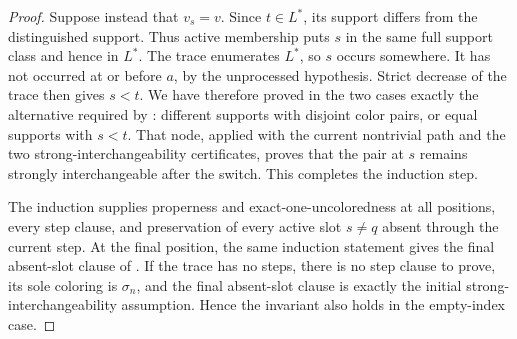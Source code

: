 \begin{proof}
Suppose instead that \(v_s=v\). Since \(t\in L^*\), its support differs from
the distinguished support. Thus active membership puts \(s\) in the same full
support class and hence in \(L^*\). The trace enumerates \(L^*\), so \(s\)
occurs somewhere. It has not occurred at or before \(a\), by the unprocessed
hypothesis. Strict decrease of the trace then gives \(s<t\). We have
therefore proved in the two cases exactly the alternative required by
: different supports with
disjoint color pairs, or equal supports with \(s<t\). That node, applied
with the current nontrivial path and the two strong-interchangeability
certificates, proves that the pair at \(s\) remains strongly interchangeable
after the switch. This completes the induction step.

The induction supplies properness and exact-one-uncoloredness at all
positions, every step clause, and preservation of every active slot \(s\ne q\)
absent through the current step. At the final position, the same
induction statement gives the final absent-slot clause of
. If the trace has no steps,
there is no step clause to prove, its sole coloring is \(\sigma_n\), and the
final absent-slot clause is exactly the initial strong-interchangeability
assumption. Hence the invariant also holds in the empty-index case.
\end{proof}
